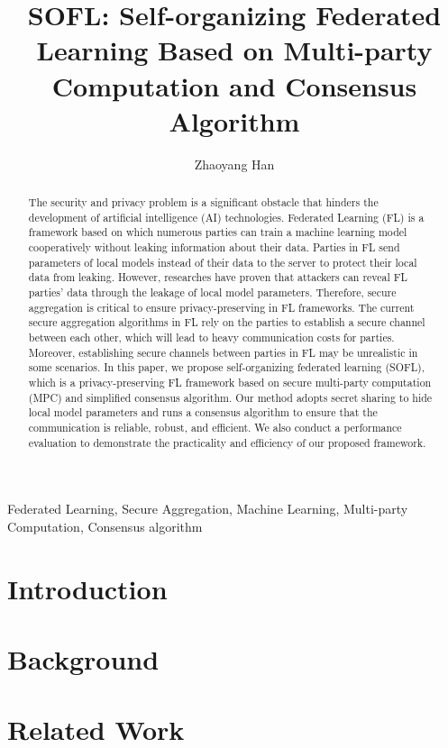 \documentclass[journal]{IEEEtran}
\title {SOFL: Self-organizing Federated Learning Based on Multi-party Computation and Consensus Algorithm}
\author{Zhaoyang Han}
\begin{document}
\maketitle

\begin{abstract}
The security and privacy problem is a significant obstacle that hinders the development of artificial intelligence (AI) technologies. Federated Learning (FL) is a framework based on which numerous parties can train a machine learning model cooperatively without leaking information about their data. Parties in FL send parameters of local models instead of their data to the server to protect their local data from leaking. However, researches have proven that attackers can reveal FL parties' data through the leakage of local model parameters. Therefore, secure aggregation is critical to ensure privacy-preserving in FL frameworks. The current secure aggregation algorithms in FL rely on the parties to establish a secure channel between each other, which will lead to heavy communication costs for parties. Moreover, establishing secure channels between parties in FL may be unrealistic in some scenarios.
In this paper, we propose self-organizing federated learning (SOFL), which is a privacy-preserving FL framework based on secure multi-party computation (MPC) and simplified consensus algorithm. Our method adopts secret sharing to hide local model parameters and runs a consensus algorithm to ensure that the communication is reliable, robust, and efficient. We also conduct a performance evaluation to demonstrate the practicality and efficiency of our proposed framework. 

\end{abstract}

\begin{IEEEkeywords}
    Federated Learning, Secure Aggregation, Machine Learning, Multi-party Computation, Consensus algorithm
\end{IEEEkeywords}


\section{Introduction} 
\label{sec:intro}


\section{Background}
\label{sec:back}


\section{Related Work}
\label{sec:related}

\end{document}
